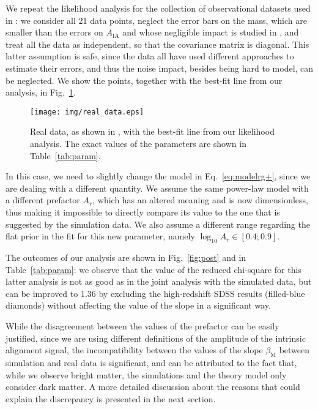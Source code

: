 \documentclass[a4paper,fleqn,usenatbib]{mnras}
\begin{document}
We repeat the likelihood analysis for the collection of observational datasets used in \citet[figure 7]{vanUitertJoachimi2017}: we consider all 21 data points, neglect the error bars on the mass, which are smaller than the errors on $A_{\mathrm{IA}}$ and whose negligible impact is studied in \citeauthor{vanUitertJoachimi2017}, and treat all the data as independent, so that the covariance matrix is diagonal. This latter assumption is safe, since the data all have used different approaches to estimate their errors, and thus the noise impact, besides being hard to model, can be neglected. We show the points, together with the best-fit line from our analysis, in Fig.~\ref{fig:realdata}.
\begin{figure}
	\centerline{	
	\texttt{[image: img/real\_data.eps]}}
	\caption{Real data, as shown in \citet[figure 7]{vanUitertJoachimi2017}, with the best-fit line from our likelihood analysis. The exact values of the parameters are shown in Table~\ref{tab:param}.}
	\label{fig:realdata}
\end{figure}

In this case, we need to slightly change the model in Eq.~\ref{eq:modelrg+}, since we are dealing with a different quantity. We assume the same power-law model with a different prefactor $A_r$, which 
has an altered meaning and is now dimensionless, thus making it impossible to directly compare its value to the one that is suggested by the simulation data. We also assume a different range regarding the flat prior in the fit for this new parameter, namely $\log_{10} A_r \in [0.4;0.9]$. 

The outcomes of our analysis are shown in Fig.~\ref{fig:post}\protect{} and in Table~\ref{tab:param}: we observe that the value of the reduced chi-square for this latter analysis is not as good as in the joint analysis with the simulated data, but can be improved to 1.36 by excluding the high-redshift SDSS results (filled-blue diamonds) without affecting the value of the slope in a significant way.

While the disagreement between the values of the prefactor can be easily justified, since we are using different definitions of the amplitude of the intrinsic alignment signal, the incompatibility between the values of the slope $\beta_{\mathrm{M}}$ between simulation and real data is significant, and can be attributed to the fact that, while we observe bright matter, the simulations and the theory model only consider dark matter. A more detailed discussion about the reasons that could explain the discrepancy is presented in the next section.
\end{document}
